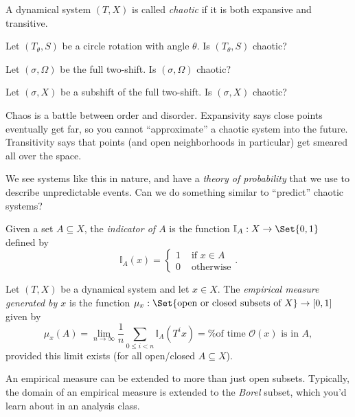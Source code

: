 	\newpage
	\begin{definition}[Chaos]
		A dynamical system $(T,X)$ is called \emph{chaotic} if it is both expansive and transitive.
	\end{definition}
	\question
	\begin{parts}
		\item Let $(T_\theta, S)$ be a circle rotation with angle $\theta$. Is $(T_\theta, S)$ chaotic?
		\item Let $(\sigma, \Omega)$ be the full two-shift. Is $(\sigma, \Omega)$ chaotic?
		\item Let $(\sigma, X)$ be a subshift of the full two-shift. Is $(\sigma, X)$ chaotic?
	\end{parts}

	\newpage
	Chaos is a battle between order and disorder. Expansivity says close points eventually get far, so you cannot
	``approximate'' a chaotic system into the future. Transitivity says that points (and open neighborhoods in
	particular) get smeared all over the space.

	We see systems like this in nature, and have a \emph{theory of probability} that we use to describe unpredictable events.
	Can we do something similar to ``predict'' chaotic systems?

	\begin{definition}
		Given a set $A\subseteq X$, the \emph{indicator of $A$} is the function
		$\mathbb I_A:X\to\Set{0,1}$ defined by
		\[
			\mathbb I_A(x) = \begin{cases}
				1 &\text{ if $x\in A$}\\ 0 &\text{ otherwise}
			\end{cases}.
		\]
	\end{definition}

	\begin{definition}
		Let $(T,X)$ be a dynamical system and let $x\in X$. The \emph{empirical measure generated by $x$}
		is the function $\mu_x:\Set{\text{open or closed subsets of }X}\to [0,1]$ given by
		\[
			\mu_x(A) = \lim_{n\to\infty} \frac{1}{n}\sum_{0\leq i < n} \mathbb I_A(T^ix) = \text{\% of time $\mathcal O(x)$ is in $A$},
		\]
		provided this limit exists (for all open/closed $A\subseteq X$).
	\end{definition}
	
	An empirical measure can be extended to more than just open subsets. Typically, the domain of an
	empirical measure is extended to the \emph{Borel} subset, which you'd learn about in an analysis class.

